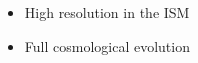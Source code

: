 \documentclass[a4paper,fleqn,usenatbib]{mnras}
\begin{document}
\begin{itemize}
    \item High resolution in the ISM
    \item Full cosmological evolution
\end{itemize}

% 
% 
\end{document}
